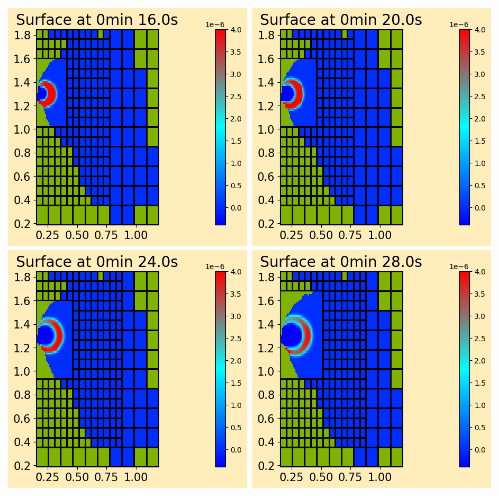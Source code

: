 \documentclass[11pt]{article}
\begin{document}
\vskip 10pt 
\includegraphics[width=0.475\textwidth]{frame0004fig0.png}
\vskip 10pt 
\includegraphics[width=0.475\textwidth]{frame0005fig0.png}
\vskip 10pt 
\includegraphics[width=0.475\textwidth]{frame0006fig0.png}
\vskip 10pt 
\includegraphics[width=0.475\textwidth]{frame0007fig0.png}
\end{document}
